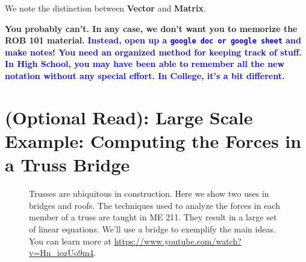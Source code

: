 \begin{itemize}
\begin{tcolorbox}
We note the distinction between \textbf{Vector} and \textbf{Matrix}.
\end{tcolorbox}
 \end{itemize}
 \vspace*{.5cm}
\begin{tcolorbox}[sharp corners, colback=green!30, colframe=green!80!blue, title=\textcolor{red}{\bf {\Large Help!} {\Huge Help!} } \textbf{\huge How am I supposed to remember all of this?}]
 
\textbf{\huge You probably can't. In any case, we don't want you to memorize the ROB 101 material.}  \textcolor{blue}{\huge \bf Instead, open up a \texttt{google doc or google sheet} and make notes! You need an organized method for keeping track of stuff. In High School, you may have been able to remember all the new notation without any special effort. In College, it's a bit different.} 
 
 \end{tcolorbox}


\section{(Optional Read): Large Scale Example: Computing the Forces in a Truss Bridge}


\begin{figure}[thb!]%
\centering
{}%
\hspace{5pt}%
%
    \caption[]{Trusses are ubiquitous in construction. Here we show two uses in bridges and roofs. The techniques used to analyze the forces in each member of a truss are taught in ME 211. They result in a large set of linear equations. We'll use a bridge to exemplify the main ideas. You can learn more at \url{https://www.youtube.com/watch?v=Hn_iozUo9m4}.}
    \label{fig:TrussStructures}
\end{figure}

